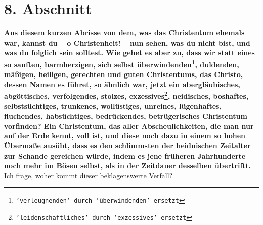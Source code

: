 \section{8. Abschnitt}  \label{kap2_ab8}

\label{ref:02_08_schlimmer_als_heiden}
\textbf{Aus diesem kurzen Abrisse von dem, was das Christentum ehemals war,
kannst
du -- o Christenheit! -- nun sehen, was du nicht bist, und was du folglich sein
solltest. Wie gehet es aber zu, dass wir statt eines so sanften, barmherzigen,
sich selbst überwindenden\footnote{\texttt{'verleugnenden' durch 'überwindenden'
ersetzt}},
duldenden, mäßigen, heiligen, gerechten und guten Christentums, das Christo,
dessen Namen es führet, so ähnlich war, jetzt ein abergläubisches, abgöttisches,
verfolgendes, stolzes, exzessives\footnote{\texttt{'leidenschaftliches' durch
'exzessives' ersetzt}},
neidisches, boshaftes, selbstsüchtiges,
trunkenes, wollüstiges, unreines, lügenhaftes, fluchendes, habsüchtiges,
bedrückendes, betrügerisches Christentum vorfinden? Ein Christentum, das aller
Abscheulichkeiten, die man nur auf der Erde kennt, voll ist, und diese noch dazu
in einem so hohen Übermaße ausübt, dass es den schlimmsten der heidnischen
Zeitalter zur Schande gereichen würde, indem es jene früheren Jahrhunderte noch
mehr im Bösen selbst, als in der Zeitdauer desselben übertriftt.} Ich frage,
woher kommt dieser beklagenswerte Verfall?

\medskip

